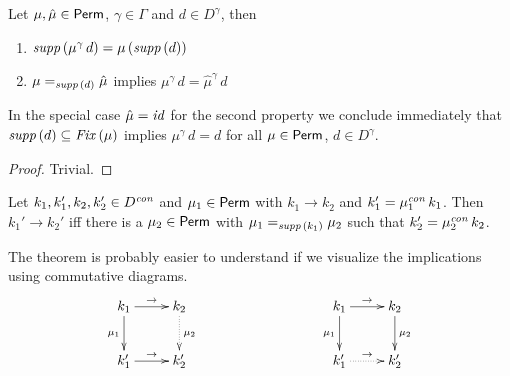 \documentclass[12pt,a4paper]{report}
\newcommand{\scon}{\nstyle{con}}
\newcommand{\id}{\nstyle{id}}
\newcommand{\Fix}[1]{\nstyle{Fix}\,(#1)}
\begin{document}
\begin{lemma}[Permutations] \label{lemma:Permutations}
  Let $\mu,\hat{\mu}\in\mathsf{Perm}$, $\gamma\in\Gamma$ and $d \in D^\gamma$, then
  \begin{enumerate}
    \item $\mathit{supp}\,(\mu^\gamma\,d) = \mu\,(\mathit{supp}\,(d))$
    \item $\mu =_{\mathit{supp}\,(d)} \hat{\mu}$ implies $\mu^\gamma\,d = \hat{\mu}^\gamma\,d$
  \end{enumerate}
\end{lemma}
%
In the special case $\hat{\mu} = \id$ for the second property we conclude immediately that
$\supp{d} \subseteq \Fix{\mu}$ implies $\mu^\gamma\,d = d$ for all $\mu\in\mathsf{Perm}$, $d\in D^\gamma$.

\begin{proof}
  Trivial.
\end{proof}

\begin{theorem} \label{theorem:small_steps_and_permutations}
  Let $k_1,k_1',k_2,k_2'\in D^\scon$ and $\mu_1\in\mathsf{Perm}$ with
  $k_1 \to k_2$ and $k_1' = \mu_1^\scon\,k_1$. Then $k_1' \to k_2'$ iff there is a $\mu_2\in\mathsf{Perm}$
  with $\mu_1 =_{\mathit{supp}\,(k_1)} \mu_2$ such that $k_2' = \mu_2^\scon\,k_2$.
\end{theorem}

The theorem is probably easier to understand if we visualize the implications using commutative
diagrams.
\[
  \xymatrix{
    k_1 \ar[r]^{\to} \ar[d]_{\mu_1} & k_2 \ar@{.>}[d]^{\mu_2} \\
    k_1' \ar[r]^{\to} & k_2'
  }
  \hspace*{3cm}
  \xymatrix{
    k_1 \ar[r]^{\to} \ar[d]_{\mu_1} & k_2 \ar[d]^{\mu_2} \\
    k_1' \ar@{.>}[r]^{\to} & k_2'
  }
\]
\end{document}
